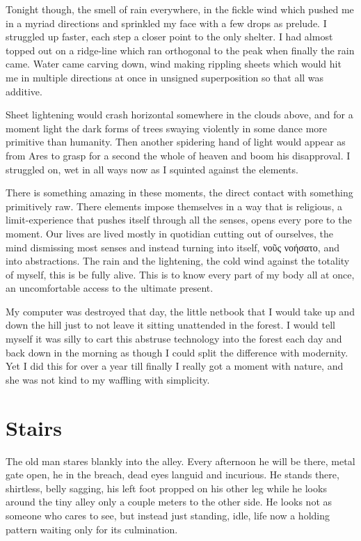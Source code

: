 \documentclass[ebook, 10pt, openright, onecolumn]{memoir}
\newcommand{\textgreek}[1]{\begingroup\fontencoding{LGR}\selectfont#1\endgroup}
\newlength{\drop}
\begin{document}
Tonight though, the smell of rain everywhere, in the fickle wind which pushed me
in a myriad directions and sprinkled my face with a few drops as prelude.  I
struggled up faster, each step a closer point to the only shelter.  I had almost
topped out on a ridge-line which ran orthogonal to the peak when finally the
rain came.  Water came carving down,  wind making rippling
sheets which would hit me in multiple directions at once in unsigned
superposition so that all was additive.

Sheet lightening would crash horizontal somewhere in the clouds above, and for a
moment light the dark forms of trees swaying violently in some dance more
primitive than humanity.  Then another spidering hand of light would appear as
from Ares to grasp for a second the whole of heaven and boom his disapproval.  I
struggled on, wet in all ways now as I squinted against the elements. 

There is something amazing in these moments, the direct contact with something
primitively raw.  There elements impose themselves in a way that is religious, a
limit-experience that pushes itself through all the senses, opens every pore to
the moment.  Our lives are lived mostly in quotidian cutting out of ourselves,
the mind dismissing most senses and instead turning into itself, \textgreek{νοῦς
  νοήσατο},  and into abstractions.  The rain and the lightening, the cold
wind against the totality of myself, this is be fully alive.  This is to know
every part of my body all at once, an uncomfortable access to the ultimate
present.

My computer was destroyed that day, the little netbook that I would take up and
down the hill just to not leave it sitting unattended in the forest.  I would
tell myself it was silly to cart this abstruse technology into the forest each
day and back down in the morning as though I could split the difference with
modernity.  Yet I did this for over a year till finally I really got a moment
with nature, and she was not kind to my waffling with simplicity.  

\chapter{Stairs}
\label{cha:stairs}

The old man stares blankly into the alley. Every afternoon he will be there,
metal gate open, he in the breach, dead eyes languid and incurious.  He stands
there, shirtless, belly sagging, his left foot propped on his other leg while he
looks around the tiny alley only a couple meters to the other side.  He looks
not as someone who cares to see, but instead just standing, idle, life now a
holding pattern waiting only for its culmination.
\end{document}

